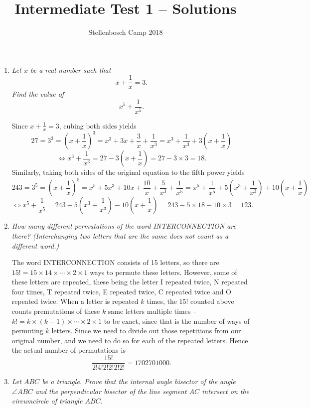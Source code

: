 \documentclass{article}
\title{Intermediate Test 1 -- Solutions}
\author{Stellenbosch Camp 2018}
\date{\vspace{-12pt}}
\begin{document}
\maketitle

\begin{enumerate}[1.]

\item %
\textit{Let $x$ be a real number such that \[ x +\frac{1}{x} = 3. \] Find the value of \[ x^5 +\frac{1}{x^5}. \]}

Since $x+\frac{1}{x} = 3$, cubing both sides yields \[ 27 = 3^3 = \left(x+\frac{1}{x}\right)^3 = x^3 +3x +\frac{3}{x} +\frac{1}{x^3} = x^3 +\frac{1}{x^3} +3\left(x+\frac{1}{x}\right) \]
\[ \iff x^3+\frac{1}{x^3} = 27 -3\left(x+\frac{1}{x}\right) = 27 -3\times3 = 18. \]
Similarly, taking both sides of the original equation to the fifth power yields \[ 243 = 3^5 = \left(x+\frac{1}{x}\right)^5 = x^5 +5x^3 +10x +\frac{10}{x} +\frac{5}{x^3} +\frac{1}{x^5} = x^5 +\frac{1}{x^5} +5\left(x^3 +\frac{1}{x^3}\right) +10\left(x+\frac{1}{x}\right) \]
\[ \iff x^5 +\frac{1}{x^5} = 243 -5\left(x^3 +\frac{1}{x^3}\right) -10\left(x+\frac{1}{x}\right) = 243 -5\times18 -10\times3 = 123. \]


\vspace{12pt}
\item %
\textit{How many different permutations of the word INTERCONNECTION are there? (Interchanging two letters that are the same does not count as a different word.)}

The word INTERCONNECTION consists of 15 letters, so there are $15! = 15\times14\times\dotsm\times2\times1$ ways to permute these letters. However, some of these letters are repeated, these being the letter I repeated twice, N repeated four times, T repeated twice, E repeated twice, C repeated twice and O repeated twice. When a letter is repeated $k$ times, the $15!$ counted above counts premutations of these $k$ same letters multiple times -- $k! = k\times(k-1)\times\dotsm\times2\times1$ to be exact, since that is the number of ways of permuting $k$ letters. Since we need to divide out those repetitions from our original number, and we need to do so for each of the repeated letters. Hence the actual number of permutations is \[\frac{15!}{2!4!2!2!2!2!} = 1702701000. \]


\vspace{12pt}
\item %
\textit{Let $ABC$ be a triangle. Prove that the internal angle bisector of the angle $\angle ABC$ and the perpendicular bisector of the line segment $AC$ intersect on the circumcircle of triangle $ABC$.}


\end{enumerate}
\end{document}
